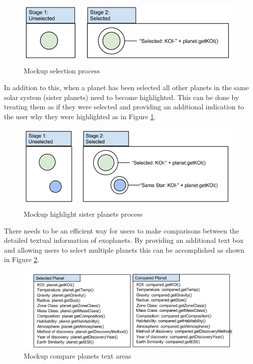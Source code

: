 \begin{enumerate}
\begin{figure}[H]
  \centering
      \includegraphics[width=.8\textwidth]{images/mockSelected.png}
  \caption{Mockup selection process}  
\end{figure}

In addition to this, when a planet has been selected all 
other planets in the
same solar system (sister planets) need to become highlighted. This can be done
by treating them as if they were selected and providing an additional indication
 to the user why they were highlighted as in Figure \ref{fig:sister}.  
\begin{figure}[H]
  \centering
      \includegraphics[width=.8\textwidth]{images/selectedSisterPlanets.png}
  \caption{Mockup highlight sister planets process}  
  \label{fig:sister}
\end{figure}

There needs to be an efficient way for users to make comparisons between the
detailed textual information of exoplanets. By providing an additional text
box and allowing users to select multiple planets this can be accomplished as shown in Figure \ref{fig:comp}.

\begin{figure}[H]
  \centering
      \includegraphics[width=.7\textwidth]{images/mockComparePlanets.png}
  \caption{Mockup compare planets text areas}  
  \label{fig:comp}
\end{figure}
\clearpage


\end{enumerate}

